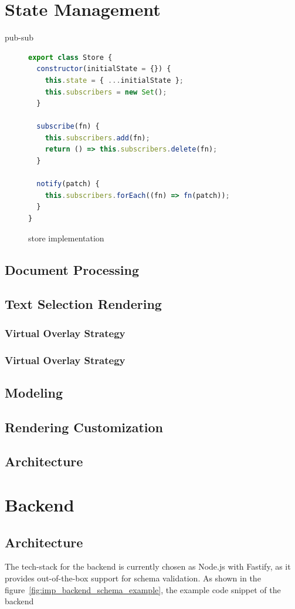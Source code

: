\section{State Management}
pub-sub
\begin{figure}[H]
  \centering
  \caption{store implementation}
  \label{fig:imp_frontend_pubsub_store}
  \begin{lstlisting}[language=JavaScript]
export class Store {
  constructor(initialState = {}) {
    this.state = { ...initialState };
    this.subscribers = new Set();
  }

  subscribe(fn) {
    this.subscribers.add(fn);
    return () => this.subscribers.delete(fn);
  }

  notify(patch) {
    this.subscribers.forEach((fn) => fn(patch));
  }
}
  \end{lstlisting}
\end{figure}
\subsection{Document Processing}

\subsection{Text Selection Rendering}
\subsubsection{Virtual Overlay Strategy}
\subsubsection{Virtual Overlay Strategy}
\subsection{Modeling}
\subsection{Rendering Customization}


\subsection{Architecture}
\section{Backend}
\subsection{Architecture}
The tech-stack for the backend is currently chosen as Node.js with Fastify, as it provides out-of-the-box support for schema validation. As shown in the figure~\ref{fig:imp_backend_schema_example}, the example code snippet of the backend

